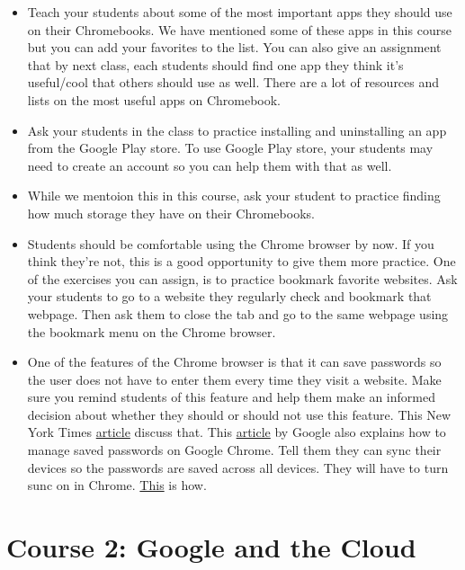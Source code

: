 \documentclass[]{book}
\begin{document}
\begin{itemize}
\item
  Teach your students about some of the most important apps they should use on their Chromebooks. We have mentioned some of these apps in this course but you can add your favorites to the list. You can also give an assignment that by next class, each students should find one app they think it's useful/cool that others should use as well. There are a lot of resources and lists on the most useful apps on Chromebook.
\item
  Ask your students in the class to practice installing and uninstalling an app from the Google Play store. To use Google Play store, your students may need to create an account so you can help them with that as well.
\item
  While we mentoion this in this course, ask your student to practice finding how much storage they have on their Chromebooks.
\item
  Students should be comfortable using the Chrome browser by now. If you think they're not, this is a good opportunity to give them more practice. One of the exercises you can assign, is to practice bookmark favorite websites. Ask your students to go to a website they regularly check and bookmark that webpage. Then ask them to close the tab and go to the same webpage using the bookmark menu on the Chrome browser.
\item
  One of the features of the Chrome browser is that it can save passwords so the user does not have to enter them every time they visit a website. Make sure you remind students of this feature and help them make an informed decision about whether they should or should not use this feature. This New York Times \href{https://www.nytimes.com/2017/01/06/technology/personaltech/managing-your-passwords-with-a-web-browser.html}{article} discuss that. This \href{https://support.google.com/chrome/answer/95606?co=GENIE.Platform\%3DDesktop\&hl=en}{article} by Google also explains how to manage saved passwords on Google Chrome. Tell them they can sync their devices so the passwords are saved across all devices. They will have to turn sunc on in Chrome. \href{https://support.google.com/chrome/answer/185277}{This} is how.
\end{itemize}

\hypertarget{google}{%
\chapter*{Course 2: Google and the Cloud}\label{google}}
\end{document}
